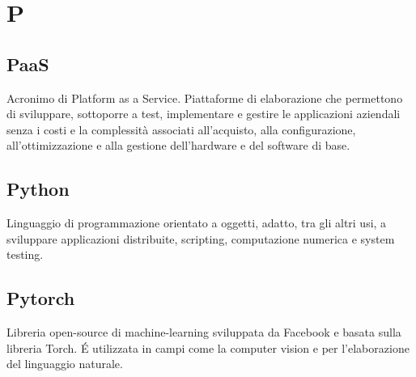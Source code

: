 \section*{P}
\markright{}
\subsection*{PaaS}
Acronimo di Platform as a Service. Piattaforme di elaborazione che permettono di sviluppare, sottoporre a test, implementare e gestire le applicazioni aziendali senza i costi e la complessità associati all'acquisto, alla configurazione, all'ottimizzazione e alla gestione dell'hardware e del software di base. 
\subsection*{Python}
Linguaggio di programmazione orientato a oggetti, adatto, tra gli altri usi, a sviluppare applicazioni distribuite, scripting, computazione numerica e system testing.
\subsection*{Pytorch}
Libreria open-source di machine-learning sviluppata da Facebook e basata sulla libreria Torch. \'E utilizzata in campi come la computer vision e per l'elaborazione del linguaggio naturale.
